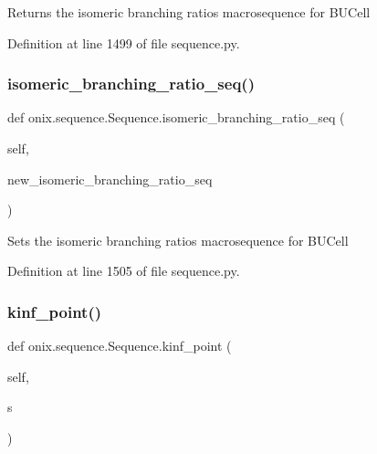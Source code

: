 \begin{DoxyVerb}Returns the isomeric branching ratios macrosequence for BUCell
\end{DoxyVerb}
 

Definition at line 1499 of file sequence.\+py.

\mbox{\label{classonix_1_1sequence_1_1Sequence_a67b5c26a9a7b347b1ae7aef8de995895}} 
\subsubsection{\texorpdfstring{isomeric\+\_\+branching\+\_\+ratio\+\_\+seq()}{isomeric\_branching\_ratio\_seq()}\hspace{0.1cm}{\footnotesize\ttfamily [2/2]}}
{\footnotesize\ttfamily def onix.\+sequence.\+Sequence.\+isomeric\+\_\+branching\+\_\+ratio\+\_\+seq (\begin{DoxyParamCaption}\item[{}]{self,  }\item[{}]{new\+\_\+isomeric\+\_\+branching\+\_\+ratio\+\_\+seq }\end{DoxyParamCaption})}

\begin{DoxyVerb}Sets the isomeric branching ratios macrosequence for BUCell
\end{DoxyVerb}
 

Definition at line 1505 of file sequence.\+py.

\mbox{\label{classonix_1_1sequence_1_1Sequence_a55d08be5c4823700d48d04a0691e0ab0}} 
\subsubsection{\texorpdfstring{kinf\+\_\+point()}{kinf\_point()}}
{\footnotesize\ttfamily def onix.\+sequence.\+Sequence.\+kinf\+\_\+point (\begin{DoxyParamCaption}\item[{}]{self,  }\item[{}]{s }\end{DoxyParamCaption})}

